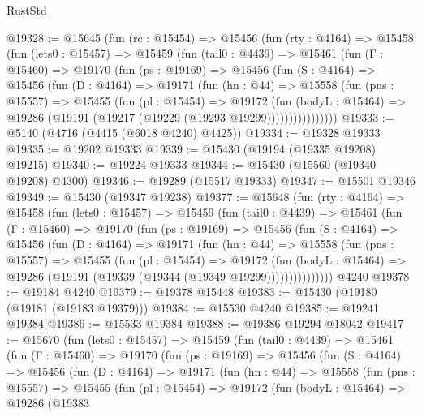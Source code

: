 \begin{lexlean}{RustStd}
\begin{coremodule}
@19328 := @15645
    (fun (rc : @15454) =>
    @15456
      (fun (rty : @4164) =>
      @15458
        (fun (lets0 : @15457) =>
        @15459
          (fun (tail0 : @4439) =>
          @15461
            (fun (Γ : @15460) =>
            @19170
              (fun (ps : @19169) =>
              @15456
                (fun (S : @4164) =>
                @15456
                  (fun (D : @4164) =>
                  @19171
                    (fun (hn : @44) =>
                    @15558
                      (fun (pns : @15557) =>
                      @15455
                        (fun (pl : @15454) =>
                        @19172
                          (fun (bodyL : @15464) =>
                          @19286 (@19191 (@19217 (@19229 (@19293 @19299))))))))))))))))
@19333 := @5140 (@4716 (@4415 (@6018 @4240) @4425))
@19334 := @19328 @19333
@19335 := @19202 @19333
@19339 := @15430 (@19194 (@19335 @19208) @19215)
@19340 := @19224 @19333
@19344 := @15430 (@15560 (@19340 @19208) @4300)
@19346 := @19289 (@15517 @19333)
@19347 := @15501 @19346
@19349 := @15430 (@19347 @19238)
@19377 := @15648
    (fun (rty : @4164) =>
    @15458
      (fun (lets0 : @15457) =>
      @15459
        (fun (tail0 : @4439) =>
        @15461
          (fun (Γ : @15460) =>
          @19170
            (fun (ps : @19169) =>
            @15456
              (fun (S : @4164) =>
              @15456
                (fun (D : @4164) =>
                @19171
                  (fun (hn : @44) =>
                  @15558
                    (fun (pns : @15557) =>
                    @15455
                      (fun (pl : @15454) =>
                      @19172
                        (fun (bodyL : @15464) =>
                        @19286 (@19191 (@19339 (@19344 (@19349 @19299)))))))))))))))
    @4240
@19378 := @19184 @4240
@19379 := @19378 @15448
@19383 := @15430 (@19180 (@19181 (@19183 @19379)))
@19384 := @15530 @4240
@19385 := @19241 @19384
@19386 := @15533 @19384
@19388 := @19386 @19294 @18042
@19417 := @15670
    (fun (lets0 : @15457) =>
    @15459
      (fun (tail0 : @4439) =>
      @15461
        (fun (Γ : @15460) =>
        @19170
          (fun (ps : @19169) =>
          @15456
            (fun (S : @4164) =>
            @15456
              (fun (D : @4164) =>
              @19171
                (fun (hn : @44) =>
                @15558
                  (fun (pns : @15557) =>
                  @15455
                    (fun (pl : @15454) =>
                    @19172
                      (fun (bodyL : @15464) =>
                      @19286
                        (@19383

\end{coremodule}
\end{lexlean}
